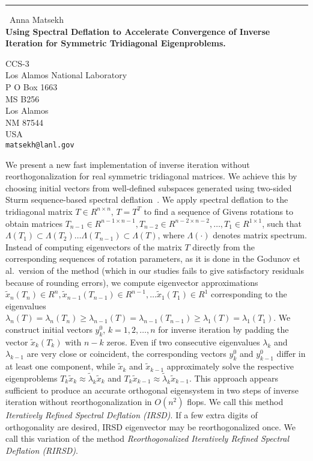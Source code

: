 \documentclass{report}
\begin{document}
\begin{center}
\rule{6in}{1pt} \
{\large Anna Matsekh \\
{\bf Using Spectral Deflation to Accelerate Convergence of Inverse Iteration for Symmetric Tridiagonal Eigenproblems.}}

CCS-3 \\ Los Alamos National Laboratory \\ P O Box 1663 \\ MS B256 \\ Los Alamos \\ NM 87544 \\ USA
\\
{\tt matsekh@lanl.gov}\end{center}

We present a new fast implementation of inverse iteration without
reorthogonalization for real symmetric tridiagonal matrices.
We achieve this by choosing initial vectors from well-defined
subspaces generated using two-sided Sturm sequence-based spectral
deflation~\cite{garant:eng}. We apply spectral deflation to the
tridiagonal matrix $T \in R^{n\times n},\, T = T^T$ to find a
sequence of Givens rotations to obtain matrices $T_{n-1} \in R^{n-1 \times
n-1}, T_{n-2} \in R^{n-2 \times n-2},\ldots, T_{1} \in R^{1\times
1}$, such that $\Lambda(T_{1}) \subset \Lambda(T_{2})\ldots
\Lambda(T_{n-1}) \subset \Lambda(T)$, where $\Lambda(\cdot)$
denotes matrix spectrum. Instead of computing eigenvectors
of the matrix $T$ directly from the corresponding sequences of
rotation parameters, as it is done in the Godunov et al.\
version of the method (which in our studies fails to give
satisfactory residuals because of rounding errors), we compute
eigenvector approximations $\tilde{x}_n(T_n) \in R^{n},
\tilde{x}_{n-1}(T_{n-1}) \in R^{n-1}, \ldots \tilde{x}_1(T_1) \in
R^{1}$ corresponding to the eigenvalues
$\lambda_n(T)=\lambda_n(T_n) \geq
\lambda_{n-1}(T)=\lambda_{n-1}(T_{n-1}) \geq
\lambda_1(T)=\lambda_1(T_1)$. We construct initial vectors
${y^0_k},\, k = 1, 2, \ldots, n$ for inverse iteration by padding
the vector $\tilde{x}_k(T_{k})$ with $n-k$ zeros. Even if two
consecutive eigenvalues $\lambda_k$ and $\lambda_{k-1}$ are very
close or coincident, the corresponding vectors ${y^0_k}$ and
${y^0_{k-1}}$ differ in at least one component, while
$\tilde{x}_k$ and $\tilde{x}_{k-1}$ approximately solve the
respective eigenproblems $T_{k} \tilde{x}_{k} \approx
\tilde{\lambda}_{k} \tilde{x}_k$ and $T_{k} \tilde{x}_{k-1}
\approx \tilde{\lambda}_{k} \tilde{x}_{k-1}$. This approach appears
sufficient to produce an accurate orthogonal eigensystem
in two steps of inverse iteration without reorthogonalization in
$O(n^2)$ flops. We
call this method \emph{Iteratively Refined Spectral Deflation (IRSD)}.
If a few extra digits of orthogonality are desired, IRSD eigenvector
may be reorthogonalized once. We call this variation of the method
\emph{Reorthogonalized Iteratively Refined Spectral Deflation (RIRSD)}.
\end{document}
